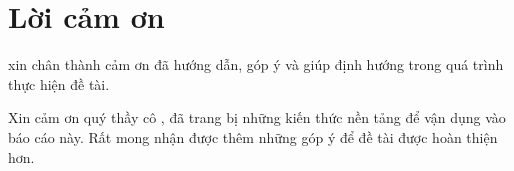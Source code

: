\section*{Lời cảm ơn}
\thispagestyle{empty}

\XungHo{} xin chân thành cảm ơn \GiangVien{} đã hướng dẫn, góp ý và giúp định hướng trong quá trình thực hiện đề tài.

Xin cảm ơn quý thầy cô \TenKhoaThuong{}, \TenTruongThuong{} đã trang bị những kiến thức nền tảng để vận dụng vào báo cáo này. Rất mong nhận được thêm những góp ý để đề tài được hoàn thiện hơn.

\clearpage
